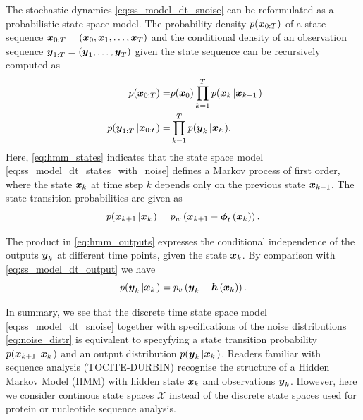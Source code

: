 \documentclass[10pt,a4paper, twocolumn]{article}
\renewcommand{\vec}[1]{{\mbox{\mathversion{bold}\ensuremath{#1}}}}
\begin{document}
The stochastic dynamics \eqref{eq:ss_model_dt_snoise} can be reformulated as a probabilistic state space model. The probability density $p(\vec{x}_{0:T})$ of a state sequence $\vec{x}_{0:T}=\left(\vec{x}_{0}, \vec{x}_{1}, \ldots ,\vec{x}_{T}\right)$ and the conditional density of an observation sequence $\vec{y}_{1:T}=\left(\vec{y}_{1}, \ldots ,\vec{y}_{T}\right)$ given the state sequence can be recursively computed as
\begin{align}
p(\vec{x}_{0:T}) =& p(\vec{x}_0) \prod_{k=1}^T p(\vec{x}_{k}\left|\vec{x}_{k-1} \right.)\label{eq:hmm_states}\\\
p(\vec{y}_{1:T}\left|\vec{x}_{0:t} \right.) =&  \prod_{k=1}^T p(\vec{y}_{k}\left|\vec{x}_{k}\right.). \label{eq:hmm_outputs}
\end{align}
Here, \eqref{eq:hmm_states} indicates that the state space model \eqref{eq:ss_model_dt_states_with_noise} defines a Markov process of first order, where the state $\vec{x}_k$ at time step $k$ depends only on the previous state $\vec{x}_{k-1}$. The state transition probabilities are given as
\begin{equation}
p(\vec{x}_{k+1}\left|\vec{x}_{k} \right.) = p_w\left(\vec{x}_{k+1} - \vec{\phi}_t \left( \vec{x}_k \right)\right).\label{eq:state_trans_prob}
\end{equation}

The product in \eqref{eq:hmm_outputs} expresses the conditional independence of the outputs $\vec{y}_{k}$ at different time points,
given the state $\vec{x}_k$. By comparison with \eqref{eq:ss_model_dt_output} we have
\begin{equation}
p(\vec{y}_k\left|\vec{x}_{k}\right.) = p_v\left( \vec{y}_k - \vec{h}\left(\vec{x}_k\right) \right).\label{eq:output_prob}
\end{equation}

In summary, we see that the discrete time state space model \eqref{eq:ss_model_dt_snoise} together with specifications of the noise distributions \eqref{eq:noise_distr} is equivalent to specyfying a state transition probability $p(\vec{x}_{k+1}\left|\vec{x}_k \right.)$ and an output distribution $p(\vec{y}_{k}\left|\vec{x}_k \right.)$. Readers familiar with sequence analysis (TOCITE-DURBIN) recognise the structure of a  Hidden Markov Model (HMM) with hidden state $\vec{x}_k$ and observations $\vec{y}_k$. However, here we consider continous state spaces $\mathcal{X}$ instead of the discrete state spaces used for protein or nucleotide sequence analysis. 
\end{document}
